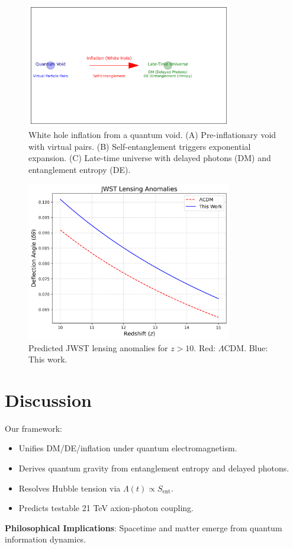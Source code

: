 \documentclass[12pt, a4paper]{article}
\begin{document}
\begin{figure}[t]
\centering
\includegraphics[width=0.8\textwidth]{white_hole_inflation.png}
\caption{White hole inflation from a quantum void. (A) Pre-inflationary void with virtual pairs. (B) Self-entanglement triggers exponential expansion. (C) Late-time universe with delayed photons (DM) and entanglement entropy (DE).}
\label{fig:white_hole}
\end{figure}

\begin{figure}[t]
\centering
\includegraphics[width=0.8\textwidth]{jwst_lensing.png}
\caption{Predicted JWST lensing anomalies for \( z > 10 \). Red: \(\Lambda\)CDM. Blue: This work.}
\label{fig:lensing_anomaly}
\end{figure}

\section{Discussion}
\label{sec:discussion}
Our framework:
\begin{itemize}
\item Unifies DM/DE/inflation under quantum electromagnetism.
\item Derives quantum gravity from entanglement entropy and delayed photons.
\item Resolves Hubble tension via \( \Lambda(t) \propto S_{\text{ent}} \).
\item Predicts testable 21 TeV axion-photon coupling.
\end{itemize}
\textbf{Philosophical Implications}: Spacetime and matter emerge from quantum information dynamics.
\end{document}
